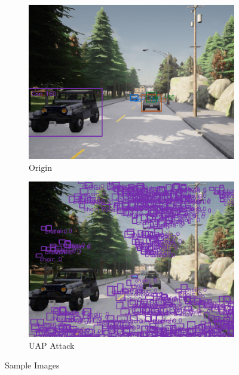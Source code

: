 \begin{figure}[H]
    \centering
    \begin{subfigure}[b]{0.48\textwidth}
        \centering
        \includegraphics[width=\linewidth]{figures/chapter_tracking/yolov3_uap_origin.png}
        \caption{Origin}
        \label{fig:tracking_attack_origin} 
    \end{subfigure}
    \begin{subfigure}[b]{0.48\textwidth}
        \centering
        \includegraphics[width=\linewidth]{figures/chapter_tracking/yolov3_uap_attack.png}
        \caption{UAP Attack}
        \label{fig:tracking_uap_attack}
    \end{subfigure}
  \caption{Sample Images}
  \label{fig:tracking_attack_uap}
\end{figure}

